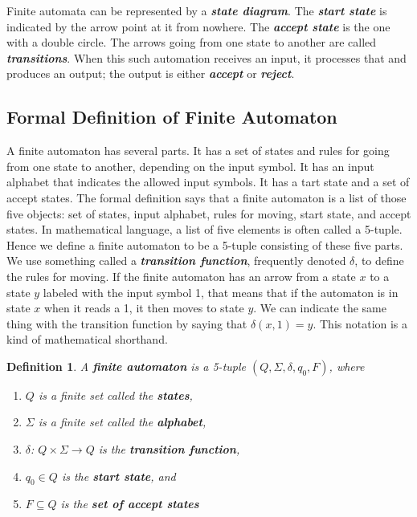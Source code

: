 \documentclass{article}
\newtheorem{definition}{Definition}
\newcommand{\define}[1]{\textbf{\textit{#1}}}
\begin{document}
Finite automata can be represented by a \define{state diagram}. The \define{start state} is indicated by the arrow point at it from nowhere. The \define{accept state} is the one with a double circle. The arrows going from one state to another are called \define{transitions}. When this such automation receives an input, it processes that and produces an output; the output is either \define{accept} or \define{reject}. 

\subsection{Formal Definition of Finite Automaton}

A finite automaton has several parts. It has a set of states and rules for going from one state to another, depending on the input symbol. It has an input alphabet that indicates the allowed input symbols. It has a tart state and a set of accept states. The formal definition says that a finite automaton is a list of those five objects: set of states, input alphabet, rules for moving, start state, and accept states. In mathematical language, a list of five elements is often called a 5-tuple. Hence we define a finite automaton to be a 5-tuple consisting of these five parts. \\

We use something called a \define{transition function}, frequently denoted $\delta$, to define the rules for moving. If the finite automaton has an arrow from a state $x$ to a state $y$ labeled with the input symbol 1, that means that if the automaton is in state $x$ when it reads a 1, it then moves to state $y$. We can indicate the same thing with the transition function by saying that $\delta(x,1) = y$. This notation is a kind of mathematical shorthand. \\ 

\begin{definition}
A \define{finite automaton} is a 5-tuple $(Q,\Sigma,\delta,q_{0},F)$, where 
\begin{enumerate}
  \item $Q$ is a finite set called the \define{states},
  \item $\Sigma$ is a finite set called the \define{alphabet},
  \item $\delta$: $Q \times \Sigma \rightarrow Q$ is the \define{transition function},
  \item $q_{0} \in Q$ is the \define{start state}, and 
  \item $F \subseteq Q$ is the \define{set of accept states} 
\end{enumerate}
\end{definition}
\end{document}
